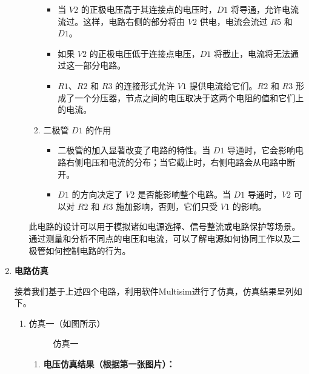 \documentclass[dvipsnames, svgnames,a4paper,11pt]{article}
\begin{document}
\begin{enumerate}
\begin{enumerate}
\begin{enumerate}
				\begin{itemize}
					\item 当 $V2$ 的正极电压高于其连接点的电压时，$D1$ 将导通，允许电流流过。这样，电路右侧的部分将由 $V2$ 供电，电流会流过 $R5$ 和 $D1$。
					\item 如果 $V2$ 的正极电压低于连接点电压，$D1$ 将截止，电流将无法通过这一部分电路。
					\item $R1$、$R2$ 和 $R3$ 的连接形式允许 $V1$ 提供电流给它们。$R2$ 和 $R3$ 形成了一个分压器，节点之间的电压取决于这两个电阻的值和它们上的电流。
				\end{itemize}
				
				\item 二极管 $D1$ 的作用
				
				\begin{itemize}
					\item 二极管的加入显著改变了电路的特性。当 $D1$ 导通时，它会影响电路右侧电压和电流的分布；当它截止时，右侧电路会从电路中断开。
					\item $D1$ 的方向决定了 $V2$ 是否能影响整个电路。当 $D1$ 导通时，$V2$ 可以对 $R2$ 和 $R3$ 施加影响，否则，它们只受 $V1$ 的影响。
				\end{itemize}
			\end{enumerate}
			
			此电路的设计可以用于模拟诸如电源选择、信号整流或电路保护等场景。通过测量和分析不同点的电压和电流，可以了解电源如何协同工作以及二极管如何控制电路的行为。
			
		\end{enumerate}
		
		\item \textbf{电路仿真}
		
		接着我们基于上述四个电路，利用软件Multisim进行了仿真，仿真结果呈列如下。
		
		\begin{enumerate}
			\item 仿真一（如图所示）
			
			\begin{figure}[htbp]
				\centering
				\caption{仿真一}
				\label{fig:fig1-2}			
			\end{figure}
			
			\begin{enumerate}
				\item \textbf{电压仿真结果（根据第一张图片）：}
				

\end{enumerate}
\end{enumerate}
\end{enumerate}
\end{document}
